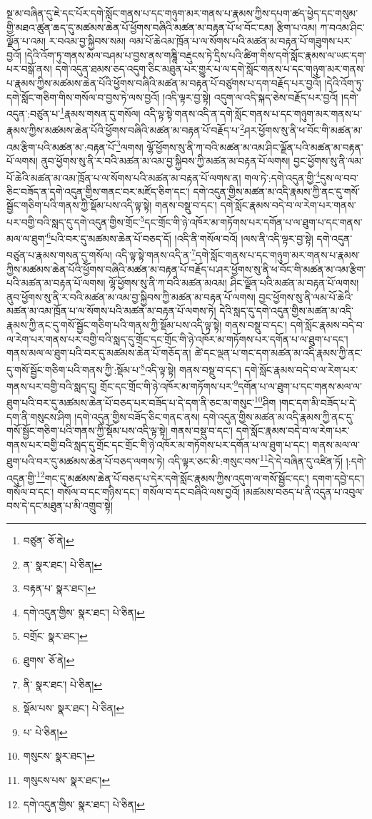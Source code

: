 སྔ་མ་བཞིན་དུ་ཇེ་དང་པོར་དགེ་སློང་གནས་པ་དང་གཉུག་མར་གནས་པ་རྣམས་ཀྱིས་དཔག་ཚད་ཕྱེད་དང་གསུམ་གྱི་མཐའ་ཚུན་ཆད་དུ་མཚམས་ཆེན་པོ་ཕྱོགས་བཞིའི་མཚན་མ་བརྟན་པོ་ཕ་བོང་ངམ། རྩིག་པ་འམ། ཀ་བའམ་ཤིང་ལྗོན་པ་འམ། ར་བའམ་བྱ་སྐྱིབས་སམ། ལམ་པོ་ཆེའམ་ཁྲོན་པ་ལ་སོགས་པའི་མཚན་མ་བརྟན་པོ་གཟུགས་པར་བྱའོ། །དེའི་འོག་ཏུ་གནས་མལ་བཤམ་པ་བྱས་ནས་གཎྜཱི་བརྡུངས་ཏེ་དྲིས་པའི་ཚིག་གིས་དགེ་སློང་རྣམས་ལ་ཡང་དག་པར་བསྒོ་ནས། དགེ་འདུན་ཐམས་ཅད་འདུག་ཅིང་མཐུན་པར་གྱུར་པ་ལ་དགེ་སློང་གནས་པ་དང་གཉུག་མར་གནས་པ་རྣམས་ཀྱིས་མཚམས་ཆེན་པོའི་ཕྱོགས་བཞིའི་མཚན་མ་བརྟན་པོ་བཙུགས་པ་དག་བརྗོད་པར་བྱའོ། །དེའི་འོག་ཏུ་དགེ་སློང་གཅིག་གིས་གསོལ་བ་བྱས་ཏེ་ལས་བྱའོ། །འདི་ལྟར་བྱ་སྟེ། འདུག་ལ་འདི་སྐད་ཅེས་བརྗོད་པར་བྱའོ། །དགེ་འདུན་:བཙུན་པ་\footnote{བཙུན་  ཅོ་ནེ། }རྣམས་གསན་དུ་གསོལ། འདི་ལྟ་སྟེ་གནས་འདི་ན་དགེ་སློང་གནས་པ་དང་གཉུག་མར་གནས་པ་རྣམས་ཀྱིས་མཚམས་ཆེན་པོའི་ཕྱོགས་བཞིའི་མཚན་མ་བརྟན་པོ་བརྗོད་པ་\footnote{ན་  སྣར་ཐང་།  པེ་ཅིན། }ཤར་ཕྱོགས་སུ་ནི་ཕ་བོང་གི་མཚན་མ་འམ་རྩིག་པའི་མཚན་མ་:བརྟན་པོ་\footnote{བརྟན་པ་  སྣར་ཐང་། }ལགས། ལྷོ་ཕྱོགས་སུ་ནི་ཀ་བའི་མཚན་མ་འམ་ཤིང་ལྗོན་པའི་མཚན་མ་བརྟན་པོ་ལགས། ནུབ་ཕྱོགས་སུ་ནི་ར་བའི་མཚན་མ་འམ་བྱ་སྐྱིབས་ཀྱི་མཚན་མ་བརྟན་པོ་ལགས། བྱང་ཕྱོགས་སུ་ནི་ལམ་པོ་ཆེའི་མཚན་མ་འམ་ཁྲོན་པ་ལ་སོགས་པའི་མཚན་མ་བརྟན་པོ་ལགས་ན། གལ་ཏེ་:དགེ་འདུན་གྱི་\footnote{དགེ་འདུན་གྱིས་  སྣར་ཐང་།  པེ་ཅིན། }དུས་ལ་བབ་ཅིང་བཟོད་ན་དགེ་འདུན་གྱིས་གནང་བར་མཛོད་ཅིག་དང་། དགེ་འདུན་གྱིས་མཚན་མ་འདི་རྣམས་ཀྱི་ནང་དུ་གསོ་སྦྱོང་གཅིག་པའི་གནས་ཀྱི་སྡོམ་པས་འདི་ལྟ་སྟེ། གནས་བསྡུ་བ་དང་། དགེ་སློང་རྣམས་བདེ་བ་ལ་རེག་པར་གནས་པར་བགྱི་བའི་སླད་དུ་དགེ་འདུན་གྱིས་གྲོང་\footnote{བགྲོང་  སྣར་ཐང་། }དང་གྲོང་གི་ཉེ་འཁོར་མ་གཏོགས་པར་དགོན་པ་ལ་ཐུག་པ་དང་གནས་མལ་ལ་ཐུག་\footnote{ཐུགས་  ཅོ་ནེ། }པའི་བར་དུ་མཚམས་ཆེན་པོ་བཅད་དོ། །འདི་ནི་གསོལ་བའོ། །ལས་ནི་འདི་ལྟར་བྱ་སྟེ། དགེ་འདུན་བཙུན་པ་རྣམས་གསན་དུ་གསོལ། འདི་ལྟ་སྟེ་གནས་འདི་ན་\footnote{ནི་  སྣར་ཐང་།  པེ་ཅིན། }དགེ་སློང་གནས་པ་དང་གཉུག་མར་གནས་པ་རྣམས་ཀྱིས་མཚམས་ཆེན་པོའི་ཕྱོགས་བཞིའི་མཚན་མ་བརྟན་པོ་བརྗོད་པ་ཤར་ཕྱོགས་སུ་ནི་ཕ་བོང་གི་མཚན་མ་འམ་རྩིག་པའི་མཚན་མ་བརྟན་པོ་ལགས། ལྷོ་ཕྱོགས་སུ་ནི་ཀ་བའི་མཚན་མའམ། ཤིང་ལྗོན་པའི་མཚན་མ་བརྟན་པོ་ལགས། ནུབ་ཕྱོགས་སུ་ནི་ར་བའི་མཚན་མ་འམ་བྱ་སྐྱིབས་ཀྱི་མཚན་མ་བརྟན་པོ་ལགས། བྱང་ཕྱོགས་སུ་ནི་ལམ་པོ་ཆེའི་མཚན་མ་འམ་ཁྲོན་པ་ལ་སོགས་པའི་མཚན་མ་བརྟན་པོ་ལགས་ཏེ། དེའི་སླད་དུ་དགེ་འདུན་གྱིས་མཚན་མ་འདི་རྣམས་ཀྱི་ནང་དུ་གསོ་སྦྱོང་གཅིག་པའི་གནས་ཀྱི་སྡོམ་པས་འདི་ལྟ་སྟེ། གནས་བསྡུ་བ་དང་། དགེ་སློང་རྣམས་བདེ་བ་ལ་རེག་པར་གནས་པར་བགྱི་བའི་སླད་དུ་གྲོང་དང་གྲོང་གི་ཉེ་འཁོར་མ་གཏོགས་པར་དགོན་པ་ལ་ཐུག་པ་དང་། གནས་མལ་ལ་ཐུག་པའི་བར་དུ་མཚམས་ཆེན་པོ་གཅོད་ན། ཚེ་དང་ལྡན་པ་གང་དག་མཚན་མ་འདི་རྣམས་ཀྱི་ནང་དུ་གསོ་སྦྱོང་གཅིག་པའི་གནས་ཀྱི་:སྡོམ་པ་\footnote{སྡོམ་པས་  སྣར་ཐང་།  པེ་ཅིན། }འདི་ལྟ་སྟེ། གནས་བསྡུ་བ་དང་། དགེ་སློང་རྣམས་བདེ་བ་ལ་རེག་པར་གནས་པར་བགྱི་བའི་སླད་དུ། གྲོང་དང་གྲོང་གི་ཉེ་འཁོར་མ་གཏོགས་པར་\footnote{པ་  པེ་ཅིན། }དགོན་པ་ལ་ཐུག་པ་དང་གནས་མལ་ལ་ཐུག་པའི་བར་དུ་མཚམས་ཆེན་པོ་བཅད་པར་བཟོད་པ་དེ་དག་ནི་ཅང་མ་གསུང་\footnote{གསུངས་  སྣར་ཐང་། }ཤིག །གང་དག་མི་བཟོད་པ་དེ་དག་ནི་གསུངས་ཤིག །དགེ་འདུན་གྱིས་བཟོད་ཅིང་གནང་ནས། དགེ་འདུན་གྱིས་མཚན་མ་འདི་རྣམས་ཀྱི་ནང་དུ་གསོ་སྦྱོང་གཅིག་པའི་གནས་ཀྱི་སྡོམ་པས་འདི་ལྟ་སྟེ། གནས་བསྡུ་བ་དང་། དགེ་སློང་རྣམས་བདེ་བ་ལ་རེག་པར་གནས་པར་བགྱི་བའི་སླད་དུ་གྲོང་དང་གྲོང་གི་ཉེ་འཁོར་མ་གཏོགས་པར་དགོན་པ་ལ་ཐུག་པ་དང་། གནས་མལ་ལ་ཐུག་པའི་བར་དུ་མཚམས་ཆེན་པོ་བཅད་ལགས་ཏེ། འདི་ལྟར་ཅང་མི་:གསུང་བས་\footnote{གསུངས་པས་  སྣར་ཐང་། }དེ་དེ་བཞིན་དུ་འཛིན་ཏོ། །:དགེ་འདུན་གྱི་\footnote{དགེ་འདུན་གྱིས་  སྣར་ཐང་།  པེ་ཅིན། }གང་དུ་མཚམས་ཆེན་པོ་བཅད་པ་དེར་དགེ་སློང་རྣམས་ཀྱིས་འདུག་ལ་གསོ་སྦྱོང་དང་། དགག་དབྱེ་དང་། གསོལ་བ་དང་། གསོལ་བ་དང་གཉིས་དང་། གསོལ་བ་དང་བཞིའི་ལས་བྱའོ། །མཚམས་བཅད་པ་ནི་འདུན་པ་འབུལ་བས་དེ་དང་མཐུན་པ་མི་འགྲུབ་སྟེ། 